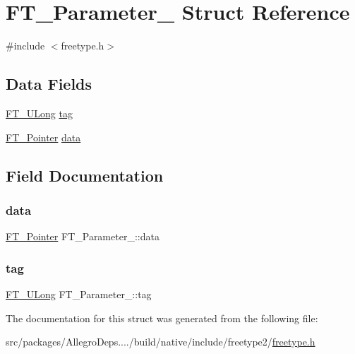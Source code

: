 \hypertarget{struct_f_t___parameter__}{}\section{F\+T\+\_\+\+Parameter\+\_\+ Struct Reference}
\label{struct_f_t___parameter__}


{\ttfamily \#include $<$freetype.\+h$>$}

\subsection*{Data Fields}
\begin{DoxyCompactItemize}
\item 
\hyperlink{fttypes_8h_a4fac88bdba78eb76b505efa6e4fbf3f5}{F\+T\+\_\+\+U\+Long} \hyperlink{struct_f_t___parameter___a5a53ef2652683a2cd9ee6a0a694cb76b}{tag}
\item 
\hyperlink{fttypes_8h_a00f9e6a0ddd7bc55f79b2f4b5b867266}{F\+T\+\_\+\+Pointer} \hyperlink{struct_f_t___parameter___a930c8885bd25be8d054443153c817c13}{data}
\end{DoxyCompactItemize}


\subsection{Field Documentation}
\mbox{\label{struct_f_t___parameter___a930c8885bd25be8d054443153c817c13}} 
\subsubsection{\texorpdfstring{data}{data}}
{\footnotesize\ttfamily \hyperlink{fttypes_8h_a00f9e6a0ddd7bc55f79b2f4b5b867266}{F\+T\+\_\+\+Pointer} F\+T\+\_\+\+Parameter\+\_\+\+::data}

\mbox{\label{struct_f_t___parameter___a5a53ef2652683a2cd9ee6a0a694cb76b}} 
\subsubsection{\texorpdfstring{tag}{tag}}
{\footnotesize\ttfamily \hyperlink{fttypes_8h_a4fac88bdba78eb76b505efa6e4fbf3f5}{F\+T\+\_\+\+U\+Long} F\+T\+\_\+\+Parameter\+\_\+\+::tag}



The documentation for this struct was generated from the following file\+:\begin{DoxyCompactItemize}
\item 
src/packages/\+Allegro\+Deps..../build/native/include/freetype2/\hyperlink{freetype_8h}{freetype.\+h}\end{DoxyCompactItemize}
